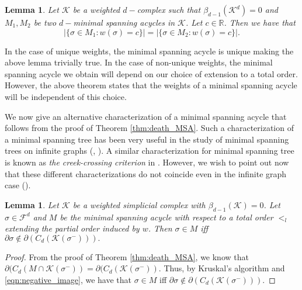 \documentclass[12pt]{amsart}
\newcommand{\gt}[1]{\textcolor{blue}{#1}}
\renewcommand{\gt}[1]{#1}
\newtheorem{corollary}[theorem]{Corollary}
\newtheorem{lemma}[theorem]{Lemma}
\numberwithin{equation}{section}
\numberwithin{theorem}{section}
\newcommand{\Real}{\mathbb R}
\newcommand{\1}{\mathbf{1}}
\def\F{\mathcal{F}}
\def\K{\mathcal{K}}
\def\supp{\mathrm{supp}}
\begin{document}
%
\begin{lemma}
\label{thm:minimal spanning acycle_weights}
Let $\K$ be a weighted $d-$complex such that $\beta_{d-1}(\K^d) = 0$ and $M_1,M_2$ be two $d-$minimal spanning acycles in $\K$.
Let \gt{$c \in \Real$.}
Then we have that
%
\[ |\{ \sigma \in M_1 : w(\sigma) = c \}| = |\{\sigma \in M_2 : w(\sigma) = c \}| .\]
%
\end{lemma}
In the case of unique weights, the minimal spanning acycle is unique making the above lemma trivially true. In the case of non-unique weights, the minimal spanning acycle we obtain will depend on our choice of extension to a total order. However, the above theorem states that the weights of a minimal spanning acycle will be independent of this choice.

We now give an alternative characterization of a minimal spanning acycle that follows from the proof of Theorem \ref{thm:death_MSA}. Such a characterization of a minimal spanning tree has been very useful in the study of minimal spanning trees on infinite graphs (\cite[Chapter 11]{Lyons16}, \cite[Proposition 2.1]{Alexander1995}). A similar characterization for minimal spanning tree is known as {\em the creek-crossing criterion} in \cite{Alexander1995}.  However, we wish to point out now that these different characterizations do not coincide even in the infinite graph case (\cite[Proposition 2.1]{Alexander1995}).
%
\begin{lemma}
\label{lem:char_MSA}
Let $\K$ be a weighted simplicial complex with $\beta_{d-1}(\K) = 0$. Let $\sigma \in \F^d$ and $M$ be the minimal spanning acycle with respect to a total order $<_l$ extending the partial order induced by $w$. Then $\sigma \in M$ iff $\partial \sigma \notin \partial (C_d(\K(\sigma^-))).$
\end{lemma}
%
\begin{proof}
From the proof of Theorem \ref{thm:death_MSA}, we know that $\partial (C_d(M \cap \K(\sigma^-)) = \partial (C_d(\K(\sigma^-)).$ Thus, by Kruskal's algorithm and \eqref{eqn:negative_image}, we have that $\sigma \in M$ iff $\partial \sigma \notin \partial (C_d(\K(\sigma^-)))$.
\end{proof}	
%
\begin{comment}
Combining Lemma \ref{lem:char_MSA} with the fact that if $\partial \sigma \in \partial (C_d(\K(\sigma^-))),$ then by Lemma \ref{lem:supp_conn}, $\supp(\partial \sigma)$ is $d-$hypergraph connected, we have the following corollary.
%

\begin{corollary}
\label{cor:hyperg_MSA}
Let $\K$ be a weighted simplicial complex with $\beta_{d-1}(\K) = 0$. Let $M$ be the minimal spanning acycle with respect to a total order $<_l$ extending the partial order induced by $w$ and $\sigma \in \F^d$. If $\supp(\partial \sigma)$ is not $d-$hypergraph connected in $\K(\sigma^-),$ then $\sigma \in M.$
\end{corollary}
\end{comment}
\end{document}
